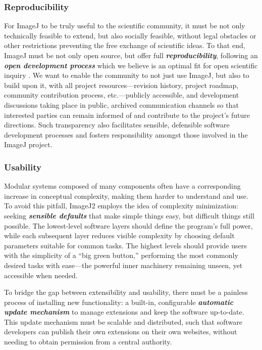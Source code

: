 \documentclass{bmcart}
\begin{document}
\subsubsection*{Reproducibility}
For ImageJ to be truly useful to the scientific community, it must be not only
technically feasible to extend, but also socially feasible, without legal
obstacles or other restrictions preventing the free exchange of scientific
ideas. To that end, ImageJ must be not only open source, but offer full
\textbf{\textit{reproducibility}}, following an \textbf{\textit{open
development process}} which we believe is an optimal fit for open scientific
inquiry \cite{software_usability}. We want to enable the community to not just
use ImageJ, but also to build upon it, with all project resources---revision
history, project roadmap, community contribution process, etc.---publicly
accessible, and development discussions taking place in public, archived
communication channels so that interested parties can remain informed of and
contribute to the project's future directions. Such transparency also
facilitates sensible, defensible software development processes and fosters
responsibility amongst those involved in the ImageJ project.

\subsubsection*{Usability}
Modular systems composed of many components often have a corresponding increase
in conceptual complexity, making them harder to understand and use. To avoid
this pitfall, ImageJ2 employs the idea of complexity minimization: seeking
\textbf{\textit{sensible defaults}} that make simple things easy, but difficult
things still possible. The lowest-level software layers should define the
program's full power, while each subsequent layer reduces visible complexity by
choosing default parameters suitable for common tasks. The highest levels
should provide users with the simplicity of a ``big green button,'' performing
the most commonly desired tasks with ease---the powerful inner machinery
remaining unseen, yet accessible when needed.

To bridge the gap between extensibility and usability, there must be a painless
process of installing new functionality: a built-in, configurable
\textbf{\textit{automatic update mechanism}} to manage extensions and keep the
software up-to-date. This update mechanism must be scalable and distributed,
such that software developers can publish their own extensions on their own
websites, without needing to obtain permission from a central authority.
\end{document}
